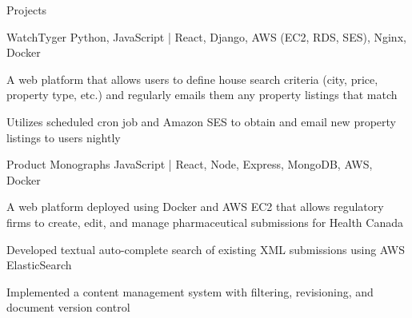 \documentclass{resume} %
\begin{document}
	\vspace{-0.5em}
	\begin{rSection}{Projects}

		\begin{rProjectSection}
			{WatchTyger}
			{}
			{Python, JavaScript \textnormal{|} React, Django, AWS (EC2, RDS, SES), Nginx, Docker}
			{}
			{
				\item A web platform that allows users to define house search criteria (city, price, property type, etc.) and regularly
				emails them any property listings that match
				\item Utilizes scheduled cron job and Amazon SES to obtain and email new property listings to users nightly
			}
		\end{rProjectSection}

		\begin{rProjectSection}
			{Product Monographs}
			{}
			{JavaScript \textnormal{|} React, Node, Express, MongoDB, AWS, Docker}
			{}
			{
				\item A web platform deployed using Docker and AWS EC2 that allows regulatory firms to create,
				edit, and manage pharmaceutical submissions for Health Canada
				\item Developed textual auto-complete search of existing XML submissions using AWS ElasticSearch
				\item Implemented a content management system with filtering, revisioning, and document version control
			}
		\end{rProjectSection}



\end{rSection}
\end{document}
